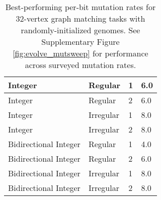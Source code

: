 \begin{table}[!htbp]
\begin{tabular}{l|l|l|l}
Integer               & Regular                   & 1                      & 6.0                                            \\ \hline
Integer               & Regular                   & 2                      & 6.0                                            \\ \hline
Integer               & Irregular                 & 1                      & 8.0                                            \\ \hline
Integer               & Irregular                 & 2                      & 8.0                                            \\ \hline
Bidirectional Integer & Regular                   & 1                      & 4.0                                            \\ \hline
Bidirectional Integer & Regular                   & 2                      & 6.0                                            \\ \hline
Bidirectional Integer & Irregular                 & 1                      & 8.0                                            \\ \hline
Bidirectional Integer & Irregular                 & 2                      & 8.0
\end{tabular}

\caption{
Best-performing per-bit mutation rates for 32-vertex graph matching tasks with randomly-initialized genomes.
See Supplementary Figure \ref{fig:evolve_mutsweep} for performance across surveyed mutation rates.
}
\label{tab:evo_graph_mut}

\end{table}

